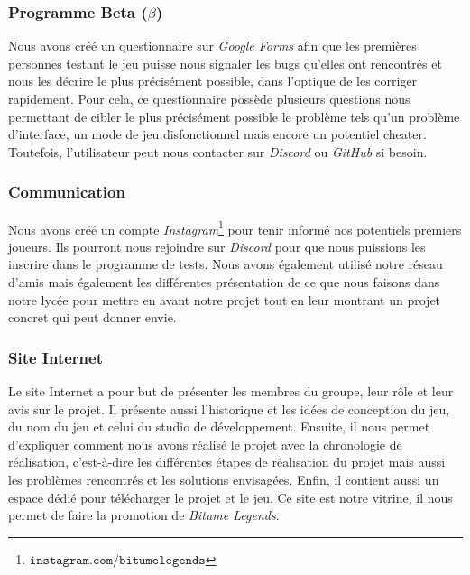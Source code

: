 \documentclass[a4paper,12pt]{article}
\newcommand{\btmlgs}{\textsl{Bitume Legends}}
\begin{document}
            \subsubsection{Programme Beta (\(\beta\))}
                Nous avons créé un questionnaire sur \textsl{Google Forms} afin que les premières personnes testant
                le jeu puisse nous signaler les bugs qu'elles ont rencontrés et nous les décrire le plus 
                précisément possible, dans l'optique de les corriger rapidement. Pour cela, ce questionnaire 
                possède plusieurs questions nous permettant de cibler le plus précisément possible le problème tels qu'un problème d'interface, un mode de jeu disfonctionnel mais encore un 
                potentiel cheater. 
                Toutefois, l'utilisateur peut nous contacter sur \textsl{Discord} ou \textsl{GitHub} si besoin.
        
            \subsubsection{Communication}
                Nous avons créé un compte \textsl{Instagram}\footnote{\(\mathtt{instagram.com/bitumelegends}\)}
                pour tenir informé nos potentiels premiers joueurs. 
                Ils pourront nous rejoindre sur \textsl{Discord} pour que nous puissions les inscrire dans le
                programme de tests. Nous avons également utilisé notre réseau d'amis mais également les différentes 
                présentation de ce que nous faisons dans notre lycée pour mettre en avant notre projet tout en leur 
                montrant un projet concret qui peut donner envie.
        
            \subsubsection{Site Internet}
                Le site Internet a pour but de présenter les membres du groupe, leur rôle et leur avis sur le projet.
                Il présente aussi l'historique et les idées de conception du jeu, du nom du jeu et celui du studio
                de développement. Ensuite, il nous permet d'expliquer comment nous avons réalisé le projet avec la
                chronologie de réalisation, c'est-à-dire les différentes étapes de réalisation du projet mais aussi
                les problèmes rencontrés et les solutions envisagées. Enfin, il contient aussi
                un espace dédié pour télécharger le projet et le jeu. Ce site est notre vitrine, il nous permet de 
                faire la promotion de \btmlgs.
        
\end{document}
